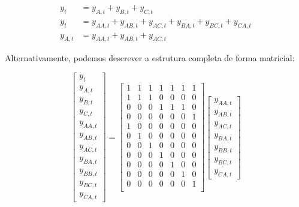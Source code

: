 \documentclass[
  12pt,
  letterpaper,
  DIV=11,
  numbers=noendperiod]{scrartcl}
\begin{document}
\begin{align}
y_t &= y_{A,t} + y_{B,t} + y_{C,t} \label{eq:ha} \\
y_t &= y_{AA,t} + y_{AB,t} + y_{AC,t} + y_{BA,t} + y_{BC,t} + y_{CA,t}\label{eq:ha_mun} \\
y_{A,t} &= y_{AA,t} + y_{AB,t} + y_{AC,t} \label{eq:haES}
\end{align}

Alternativamente, podemos descrever a estrutura completa de forma
matricial:

\[
\begin{bmatrix}
    y_{t} \\
    y_{A, t} \\
    y_{B, t} \\
    y_{C, t} \\
    y_{AA, t} \\
    y_{AB, t} \\
    y_{AC, t} \\
    y_{BA, t} \\
    y_{BB, t} \\
    y_{BC, t} \\
    y_{CA, t}
\end{bmatrix}
=
\begin{bmatrix}
    1 & 1 & 1 & 1 & 1 & 1 & 1 \\
    1 & 1 & 1 & 0 & 0 & 0 & 0 \\
    0 & 0 & 0 & 1 & 1 & 1 & 0 \\
    0 & 0 & 0 & 0 & 0 & 0 & 1 \\
    1 & 0 & 0 & 0 & 0 & 0 & 0 \\
    0 & 1 & 0 & 0 & 0 & 0 & 0 \\
    0 & 0 & 1 & 0 & 0 & 0 & 0 \\
    0 & 0 & 0 & 1 & 0 & 0 & 0 \\
    0 & 0 & 0 & 0 & 1 & 0 & 0 \\
    0 & 0 & 0 & 0 & 0 & 1 & 0 \\
    0 & 0 & 0 & 0 & 0 & 0 & 1 \\
\end{bmatrix}
\begin{bmatrix}
    y_{AA, t} \\
    y_{AB, t} \\
    y_{AC, t} \\
    y_{BA, t} \\
    y_{BB, t} \\
    y_{BC, t} \\
    y_{CA, t}
\end{bmatrix}
\]
\end{document}
